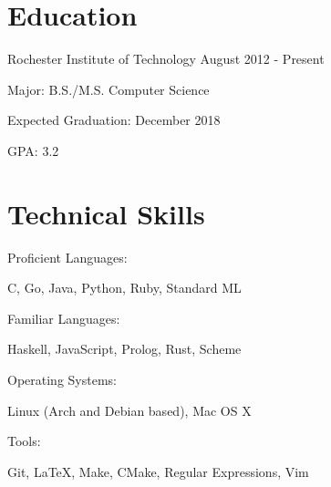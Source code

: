 \documentclass[a4paper,margin,line]{resume}
\newcommand{\rdate}[1]{\hfill {\small #1}}
\begin{document}
\begin{resume}

\section{\mysidestyle Education}
\begin{compactdesc}
    \item[Rochester Institute of Technology] \rdate{August 2012 - Present}
    \begin{asparablank} { \small
        \item Major: B.S./M.S. Computer Science
        \item Expected Graduation: December 2018
        \item GPA: 3.2
    } \end{asparablank}
\end{compactdesc}

\section{\mysidestyle Technical Skills}
\begin{compactdesc}
    \item[Proficient Languages:]
    \begin{asparablank} {\small
        \item C, Go, Java, Python, Ruby, Standard ML
    } \end{asparablank}

    \item[Familiar Languages:]
    \begin{asparablank} {\small
        \item Haskell, JavaScript, Prolog, Rust, Scheme
    } \end{asparablank}

    \item[Operating Systems:]
    \begin{asparablank} {\small
        \item Linux (Arch and Debian based), Mac OS X
    } \end{asparablank}

    \item[Tools:]
    \begin{asparablank} { \small
        \item Git, \LaTeX, Make, CMake, Regular Expressions, Vim
    } \end{asparablank}
\end{compactdesc}


\end{resume}
\end{document}
